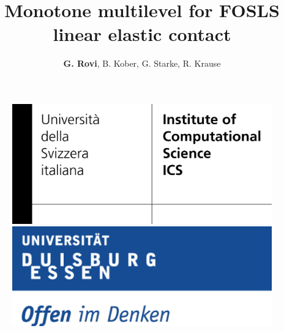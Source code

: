 \documentclass[8pt, oneside]{beamer}   	%
\title{ \textcolor{dkgrey}{  \textbf{Monotone multilevel for FOSLS linear elastic contact} }}
\author{\textcolor{dkgrey}{\textbf{G. Rovi}, B. Kober, G. Starke, R. Krause}}
\institute{Universit\"at Duisburg\,-\,Essen, Germany \\ Universit\aaa~della Svizzera italiana, Switzerland}
\begin{document}
 \begin{frame}
\titlepage
\begin{figure}[htbp!]
	\includegraphics[scale=0.7]{img/logo_ics}
	\quad
		\includegraphics[scale=0.3]{img/essenlogo}
\end{figure}
\end{frame}








 
\end{document}
